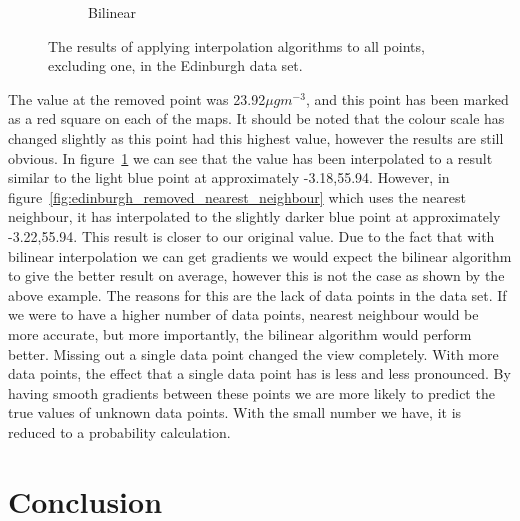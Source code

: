 \begin{figure}[H]
\begin{subfigure}{0.7\textwidth}
                    \caption{Bilinear}
                    \label{fig:edinburgh_removed_bilinear}
                \end{subfigure}
                \caption{The results of applying interpolation algorithms to all points, excluding one, in the Edinburgh data set.}
                \label{fig:edinburgh_removed_example}
            \end{figure}

            The value at the removed point was 23.92$\mu gm^{-3}$, and this point has been marked as a red square on each of the maps. It should be noted that the colour scale has changed slightly as this point had this highest value, however the results are still obvious. In figure~\ref{fig:edinburgh_removed_bilinear} we can see that the value has been interpolated to a result similar to the light blue point at approximately -3.18,55.94. However, in figure~\ref{fig:edinburgh_removed_nearest_neighbour} which uses the nearest neighbour, it has interpolated to the slightly darker blue point at approximately -3.22,55.94. This result is closer to our original value. Due to the fact that with bilinear interpolation we can get gradients we would expect the bilinear algorithm to give the better result on average, however this is not the case as shown by the above example. The reasons for this are the lack of data points in the data set. If we were to have a higher number of data points, nearest neighbour would be more accurate, but more importantly, the bilinear algorithm would perform better. Missing out a single data point changed the view completely. With more data points, the effect that a single data point has is less and less pronounced. By having smooth gradients between these points we are more likely to predict the true values of unknown data points. With the small number we have, it is reduced to a probability calculation. 


	\section{Conclusion}


